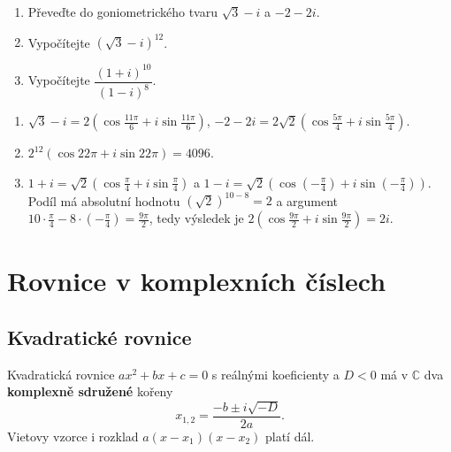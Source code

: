 \begin{problem}
  \begin{enumerate}[label=(\alph*)]
    \item Převeďte do goniometrického tvaru $\sqrt{3} - i$ a $-2 - 2i$.
    \item Vypočítejte ${(\sqrt{3} - i)}^{12}$.
    \item Vypočítejte $\dfrac{{(1 + i)}^{10}}{{(1 - i)}^{8}}$.
  \end{enumerate}
\end{problem}

\begin{solution}
  \begin{enumerate}[label=(\alph*)]
    \item $\sqrt{3} - i = 2\left(\cos\frac{11\pi}{6} + i\sin\frac{11\pi}{6}\right)$, $-2 - 2i = 2\sqrt{2}\left(\cos\frac{5\pi}{4} + i\sin\frac{5\pi}{4}\right)$.
    \item $2^{12}\left(\cos 22\pi + i\sin 22\pi\right) = 4096$.
    \item $1 + i = \sqrt{2}\left(\cos\frac{\pi}{4} + i\sin\frac{\pi}{4}\right)$ a $1 - i = \sqrt{2}\left(\cos\left(-\frac{\pi}{4}\right) + i\sin\left(-\frac{\pi}{4}\right)\right)$. Podíl má absolutní hodnotu ${\left(\sqrt{2}\right)}^{10 - 8} = 2$ a argument $10\cdot\frac{\pi}{4} - 8\cdot\left(-\frac{\pi}{4}\right) = \frac{9\pi}{2}$, tedy výsledek je $2\left(\cos\frac{9\pi}{2} + i\sin\frac{9\pi}{2}\right) = 2i$.
  \end{enumerate}
\end{solution}

\section{Rovnice v komplexních číslech}

\subsection{Kvadratické rovnice}\label{sec:komplexni-kvadraticke}

\begin{definitionbox}
  Kvadratická rovnice $ax^2 + bx + c = 0$ s reálnými koeficienty a $D < 0$ má v $\mathbb{C}$ dva \textbf{komplexně sdružené} kořeny
  \begin{equation*}
    x_{1,2} = \frac{-b\pm i\sqrt{-D}}{2a}.
  \end{equation*}
  Vietovy vzorce i rozklad $a(x - x_1)(x - x_2)$ platí dál.
\end{definitionbox}

